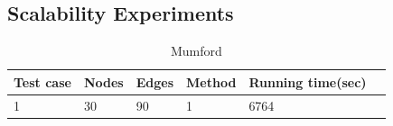 \subsection{Scalability Experiments}
\label{subsec:scalabilityExperiments_results}

\begin{table}[H]
    \centering
    \begin{tabular}{|l|l|l|l|l|l|}
        \hline
        Test case & Nodes&Edges & Method & Running time(sec) \\
        \hline
        1 & 30&90 & 1 & 6764 \\
        \hline
    \end{tabular}
    \caption{Mumford}
    \label{table:results_mumford}
\end{table}

